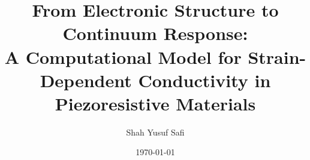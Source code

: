 \usepackage[margin=1in]{geometry}
\usepackage{amsmath}
\usepackage{amssymb}
\usepackage{graphicx}
\usepackage{hyperref}
\usepackage[backend=biber,style=numeric]{biblatex}

\title{From Electronic Structure to Continuum Response:\\
A Computational Model for Strain-Dependent Conductivity in Piezoresistive Materials}
\author{Shah Yusuf Safi}
\date{\today}
